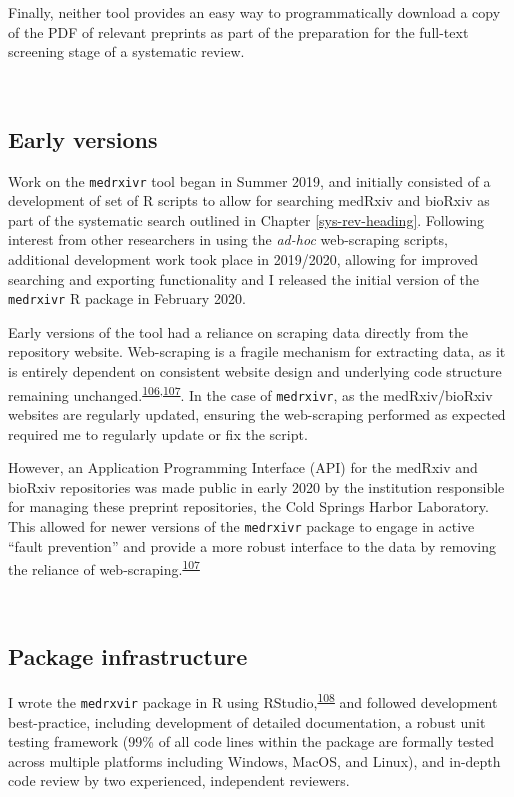 \documentclass[a4paper, twoside]{templates/ociamthesis}
\begin{document}
Finally, neither tool provides an easy way to programmatically download a copy of the PDF of relevant preprints as part of the preparation for the full-text screening stage of a systematic review.

~

\hypertarget{early-versions}{%
\subsection{Early versions}\label{early-versions}}

Work on the \texttt{medrxivr} tool began in Summer 2019, and initially consisted of a development of set of R scripts to allow for searching medRxiv and bioRxiv as part of the systematic search outlined in Chapter \ref{sys-rev-heading}. Following interest from other researchers in using the \emph{ad-hoc} web-scraping scripts, additional development work took place in 2019/2020, allowing for improved searching and exporting functionality and I released the initial version of the \texttt{medrxivr} R package in February 2020.

Early versions of the tool had a reliance on scraping data directly from the repository website. Web-scraping is a fragile mechanism for extracting data, as it is entirely dependent on consistent website design and underlying code structure remaining unchanged.\textsuperscript{\protect\hyperlink{ref-shaw2002}{106},\protect\hyperlink{ref-laprie1992}{107}}. In the case of \texttt{medrxivr}, as the medRxiv/bioRxiv websites are regularly updated, ensuring the web-scraping performed as expected required me to regularly update or fix the script.

However, an Application Programming Interface (API) for the medRxiv and bioRxiv repositories was made public in early 2020 by the institution responsible for managing these preprint repositories, the Cold Springs Harbor Laboratory. This allowed for newer versions of the \texttt{medrxivr} package to engage in active ``fault prevention'' and provide a more robust interface to the data by removing the reliance of web-scraping.\textsuperscript{\protect\hyperlink{ref-laprie1992}{107}}

~

\hypertarget{package-infrastructure}{%
\subsection{Package infrastructure}\label{package-infrastructure}}

I wrote the \texttt{medrxvir} package in R using RStudio,\textsuperscript{\protect\hyperlink{ref-rcoreteam2019}{108}} and followed development best-practice, including development of detailed documentation, a robust unit testing framework (99\% of all code lines within the package are formally tested across multiple platforms including Windows, MacOS, and Linux), and in-depth code review by two experienced, independent reviewers.
\end{document}
